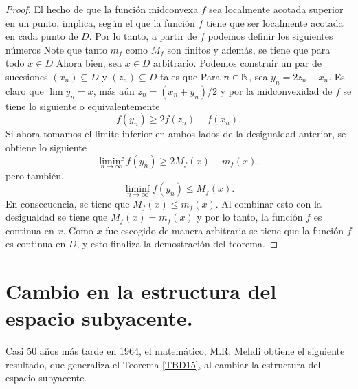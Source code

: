 \begin{proof}
El hecho de que la función midconvexa $f$ sea localmente acotada superior
en un punto, implica, según el  que la función $f$ tiene que
ser localmente acotada en cada punto de $D$. Por lo tanto, a partir de $f$
podemos definir los siguientes números
Note que tanto $m_f$ como $M_f$ son finitos y además, se tiene que para
todo $x\in D$
Ahora bien, sea $x\in D$ arbitrario. Podemos construir un par de sucesiones 
$(x_n)\subseteq D$ y $(z_n)\subseteq D$ tales que 
Para $n\in\mathbb{N}$, sea $y_n = 2z_n-x_n$. Es claro que $\lim y_n = x$, más aún
$z_n=(x_n+y_n)/2$ y por la midconvexidad de $f$ se tiene lo siguiente
o equivalentemente 
$$
f(y_n) \geq 2f(z_n)-f(x_n).
$$
Si ahora tomamos el limite inferior en ambos lados de la desigualdad anterior, 
se obtiene lo siguiente
$$
\liminf_{n\to\infty} f(y_n) \geq 2M_f(x)-m_f(x),
$$
pero también,
$$
\liminf_{n\to\infty} f(y_n) \leq M_f(x).
$$
En consecuencia, se tiene que $M_f(x)\leq m_f(x)$. Al combinar esto 
con la desigualdad  se tiene que $M_f(x)=m_f(x)$ y por lo tanto,
la función $f$ es continua en $x$. Como $x$ fue escogido de manera arbitraria
se tiene que la función $f$ es continua en $D$, y esto finaliza la demostración
del teorema.
\end{proof}



\section{Cambio en la estructura del espacio subyacente.}

Casi 50 años más tarde en 1964, el matemático, M.R. Mehdi \cite{Meh64} obtiene 
el siguiente resultado, que generaliza el Teorema \ref{TBD15}, 
al cambiar la estructura del espacio subyacente.


